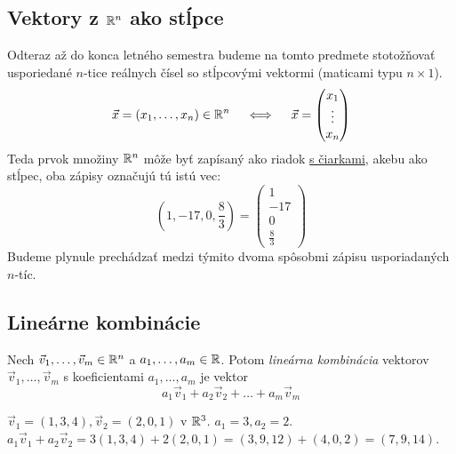 \subsection{Vektory z $\mathbb{R}^n$ ako stĺpce}
Odteraz až do konca letného semestra budeme na tomto predmete stotožňovať
usporiedané $n$-tice reálnych čísel so stĺpcovými vektormi (maticami typu $n \times 1$).
$$ \vec{x} = (x_1, \dots, x_n) \in \mathbb{R}^n \quad \iff \quad \vec{x} = \begin{pmatrix} x_1 \\ \vdots \\ x_n \end{pmatrix} $$
Teda prvok množiny $\mathbb{R}^n$ môže byť zapísaný ako riadok \underline{s čiarkami}, akebu
ako stĺpec, oba zápisy označujú tú istú vec:
\[
(1,-17,0,\frac{8}{3})=
\begin{pmatrix}
1\\-17\\0\\\frac{8}{3}
\end{pmatrix}
\]
Budeme plynule prechádzať medzi týmito dvoma spôsobmi zápisu usporiadaných $n$-tíc.


\subsection{Lineárne kombinácie}
\begin{definition}
Nech $\vec{v}_1, \dots, \vec{v}_m \in \mathbb{R}^n$ a $a_1, \dots, a_m \in \mathbb{R}$.
Potom \emph{lineárna kombinácia} vektorov $\vec{v}_1, \dots, \vec{v}_m$ s koeficientami $a_1, \dots, a_m$ je vektor
$$ a_1\vec{v}_1 + a_2\vec{v}_2 + \dots + a_m\vec{v}_m $$
\end{definition}

\begin{example}
$\vec{v}_1 = (1,3,4), \vec{v}_2 = (2,0,1)$ v $\mathbb{R}^3$.
$a_1 = 3, a_2 = 2$.
$a_1\vec{v}_1 + a_2\vec{v}_2 = 3(1,3,4) + 2(2,0,1) = (3,9,12) + (4,0,2) = (7,9,14)$.
\end{example}

